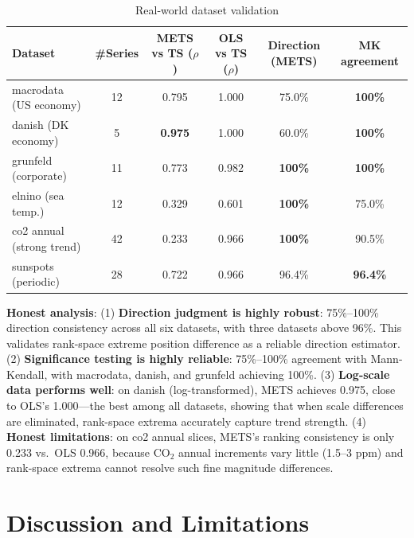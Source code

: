 \documentclass[11pt]{article}
\begin{document}
\begin{table}[htbp]
\centering
\caption{Real-world dataset validation}
\label{tab:real}
\begin{tabular}{lccccc}
\toprule
Dataset & \#Series & METS vs TS ($\rho$) & OLS vs TS ($\rho$) & Direction (METS) & MK agreement \\
\midrule
macrodata (US economy) & 12 & 0.795 & 1.000 & 75.0\% & \textbf{100\%} \\
danish (DK economy) & 5 & \textbf{0.975} & 1.000 & 60.0\% & \textbf{100\%} \\
grunfeld (corporate) & 11 & 0.773 & 0.982 & \textbf{100\%} & \textbf{100\%} \\
elnino (sea temp.) & 12 & 0.329 & 0.601 & \textbf{100\%} & 75.0\% \\
co2 annual (strong trend) & 42 & 0.233 & 0.966 & \textbf{100\%} & 90.5\% \\
sunspots (periodic) & 28 & 0.722 & 0.966 & 96.4\% & \textbf{96.4\%} \\
\bottomrule
\end{tabular}
\end{table}

\textbf{Honest analysis}:
(1) \textbf{Direction judgment is highly robust}: 75\%--100\% direction consistency across all six datasets, with three datasets above 96\%. This validates rank-space extreme position difference as a reliable direction estimator.
(2) \textbf{Significance testing is highly reliable}: 75\%--100\% agreement with Mann-Kendall, with macrodata, danish, and grunfeld achieving 100\%.
(3) \textbf{Log-scale data performs well}: on danish (log-transformed), METS achieves 0.975, close to OLS's 1.000---the best among all datasets, showing that when scale differences are eliminated, rank-space extrema accurately capture trend strength.
(4) \textbf{Honest limitations}: on co2 annual slices, METS's ranking consistency is only 0.233 vs.\ OLS 0.966, because CO$_2$ annual increments vary little (1.5--3 ppm) and rank-space extrema cannot resolve such fine magnitude differences.

\section{Discussion and Limitations}
\end{document}
